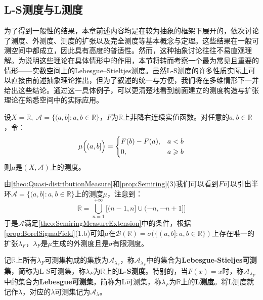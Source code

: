 \subsection{L-S测度与L测度}
为了得到一般性的结果，本章前述内容均是在较为抽象的框架下展开的，依次讨论了测度、外测度、测度的扩张以及完全测度等基本概念与定理。这些结果在一般可测空间中都成立，因此具有高度的普适性。然而，这种抽象讨论往往不易直观理解。为说明这些理论在具体情形中的作用，本节将转而考察一个最为常见且重要的情形——实数空间上的Lebesgue–Stieltjes测度。虽然L-S测度的许多性质实际上可以直接由前述抽象理论推出，但为了叙述的统一与方便，我们将在多维情形下一并给出这些结论。通过这一具体例子，可以更清楚地看到前面建立的测度构造与扩张理论在熟悉空间中的实际应用。
\begin{theorem}\label{theo:Quasi-distributionMeasure}
	设$X=\mathbb{R},\;\mathscr{A}=\{(a,b]:a,b\in\mathbb{R}\}$，$F$为$\mathbb{R}$上非降右连续实值函数。对任意的$a,b\in\mathbb{R}$，令：
	\begin{equation*}
		\mu\Bigl((a,b]\Bigr)=
		\begin{cases}
			F(b)-F(a),&a<b \\
			0,&a\geqslant b
		\end{cases}
	\end{equation*}
	则$\mu$是$(X,\mathscr{A})$上的测度。
\end{theorem}
\begin{note}
	由\cref{theo:Quasi-distributionMeasure}和\cref{prop:Semiring}(3)我们可以看到$F$可以引出半环$\mathscr{A}=\{(a,b]:a,b\in\mathbb{R}\}$上的测度$\mu$，注意到：
	\begin{equation*}
		\mathbb{R}=\underset{n=1}{\overset{+\infty}{\bigcup}}\Big[(n-1,n]\cup(-n,-n+1]\Big]
	\end{equation*}
	于是$\mathscr{A}$满足\cref{theo:SemiringMeasureExtension}中的条件，根据\cref{prop:BorelSigmaField}(1.b)可知$\mu$在$\mathcal{B}(\mathbb{R})=\sigma(\{(a,b]:a,b\in\mathbb{R}\})$上存在唯一的扩张$\lambda_F$，$\lambda_F$是$\mu$生成的外测度且是$\sigma$有限测度。
\end{note}
\begin{definition}
	记$\mathbb{R}$上所有$\lambda_F$可测集构成的集族为$\mathscr{A}_{\lambda_F}$，称$\mathscr{A}_{\lambda_F}$中的集合为\textbf{Lebesgue-Stieljes可测集}，简称为L-S可测集，称$\lambda_F$为$\mathbb{R}$上的\textbf{L-S测度}。特别的，当$F(x)=x$时，称$\mathscr{A}_{\lambda_F}$中的集合为\textbf{Lebesgue可测集}，简称为L可测集，称$\lambda_F$为$\mathbb{R}$上的\textbf{L测度}。将L测度就记作$\lambda$，对应的$\lambda$可测集记为$\mathscr{A}_{\lambda}$。
\end{definition}